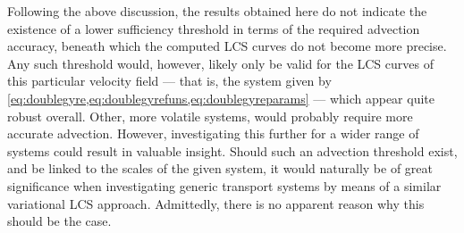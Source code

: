 

Following the above discussion, the results obtained here do not indicate
the existence of a lower sufficiency threshold in terms of the required
advection accuracy, beneath which the computed LCS curves do not become more
precise. Any such threshold would, however, likely only be valid for the LCS
curves of this particular velocity field --- that is, the system given by
\cref{eq:doublegyre,eq:doublegyrefuns,eq:doublegyreparams} --- which
appear quite robust overall. Other, more volatile systems, would probably
require more accurate advection. However, investigating this further for a
wider range of systems could result in valuable insight. Should such an
advection threshold exist, and be linked to the scales of the given system,
it would naturally be of great significance when investigating generic transport
systems by means of a similar variational LCS approach. Admittedly, there is no
apparent reason why this should be the case.


